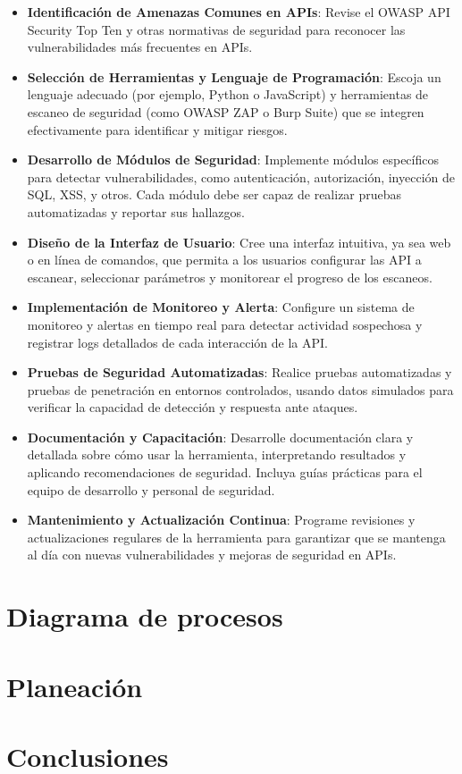 \documentclass{article}
\begin{document}
    \begin{itemize}
        \item \textbf{Identificación de Amenazas Comunes en APIs}: Revise el OWASP API Security Top Ten y otras normativas de seguridad para reconocer las vulnerabilidades más frecuentes en APIs.
        \item \textbf{Selección de Herramientas y Lenguaje de Programación}: Escoja un lenguaje adecuado (por ejemplo, Python o JavaScript) y herramientas de escaneo de seguridad (como OWASP ZAP o Burp Suite) que se integren efectivamente para identificar y mitigar riesgos.
        \item \textbf{Desarrollo de Módulos de Seguridad}: Implemente módulos específicos para detectar vulnerabilidades, como autenticación, autorización, inyección de SQL, XSS, y otros. Cada módulo debe ser capaz de realizar pruebas automatizadas y reportar sus hallazgos.
        \item \textbf{Diseño de la Interfaz de Usuario}: Cree una interfaz intuitiva, ya sea web o en línea de comandos, que permita a los usuarios configurar las API a escanear, seleccionar parámetros y monitorear el progreso de los escaneos.
        \item \textbf{Implementación de Monitoreo y Alerta}: Configure un sistema de monitoreo y alertas en tiempo real para detectar actividad sospechosa y registrar logs detallados de cada interacción de la API.
        \item \textbf{Pruebas de Seguridad Automatizadas}: Realice pruebas automatizadas y pruebas de penetración en entornos controlados, usando datos simulados para verificar la capacidad de detección y respuesta ante ataques.
        \item \textbf{Documentación y Capacitación}: Desarrolle documentación clara y detallada sobre cómo usar la herramienta, interpretando resultados y aplicando recomendaciones de seguridad. Incluya guías prácticas para el equipo de desarrollo y personal de seguridad.
        \item \textbf{Mantenimiento y Actualización Continua}: Programe revisiones y actualizaciones regulares de la herramienta para garantizar que se mantenga al día con nuevas vulnerabilidades y mejoras de seguridad en APIs.        
    \end{itemize}
    \section{Diagrama de procesos}
    
    \section{Planeación}
    
    \section{Conclusiones}
\end{document}
